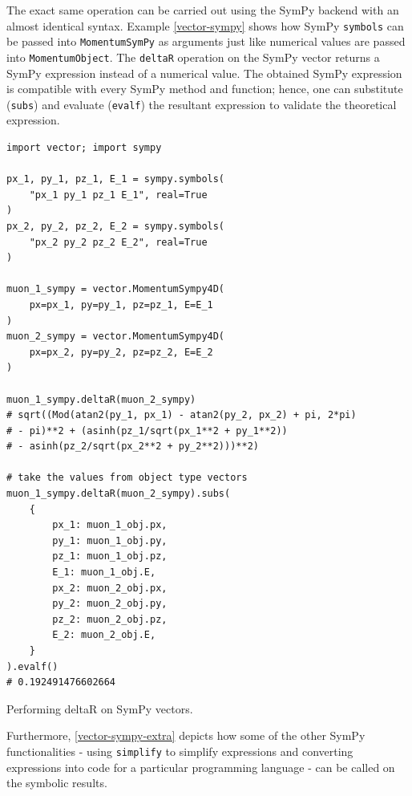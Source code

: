 \documentclass{webofc}
\begin{document}
The exact same operation can be carried out using the SymPy backend with an almost identical syntax. Example \ref{vector-sympy} shows how SymPy \texttt{symbols} can be passed into \texttt{MomentumSymPy} as arguments just like numerical values are passed into \texttt{MomentumObject}. The \texttt{deltaR} operation on the SymPy vector returns a SymPy expression instead of a numerical value. The obtained SymPy expression is compatible with every SymPy method and function; hence, one can substitute (\texttt{subs}) and evaluate (\texttt{evalf}) the resultant expression to validate the theoretical expression.

\begin{listing}[!ht]
\begin{verbatim}
import vector; import sympy

px_1, py_1, pz_1, E_1 = sympy.symbols(
    "px_1 py_1 pz_1 E_1", real=True
)
px_2, py_2, pz_2, E_2 = sympy.symbols(
    "px_2 py_2 pz_2 E_2", real=True
)

muon_1_sympy = vector.MomentumSympy4D(
    px=px_1, py=py_1, pz=pz_1, E=E_1
)
muon_2_sympy = vector.MomentumSympy4D(
    px=px_2, py=py_2, pz=pz_2, E=E_2
)

muon_1_sympy.deltaR(muon_2_sympy)
# sqrt((Mod(atan2(py_1, px_1) - atan2(py_2, px_2) + pi, 2*pi)
# - pi)**2 + (asinh(pz_1/sqrt(px_1**2 + py_1**2))
# - asinh(pz_2/sqrt(px_2**2 + py_2**2)))**2)

# take the values from object type vectors
muon_1_sympy.deltaR(muon_2_sympy).subs(
    {
        px_1: muon_1_obj.px,
        py_1: muon_1_obj.py,
        pz_1: muon_1_obj.pz,
        E_1: muon_1_obj.E,
        px_2: muon_2_obj.px,
        py_2: muon_2_obj.py,
        pz_2: muon_2_obj.pz,
        E_2: muon_2_obj.E,
    }
).evalf()
# 0.192491476602664
\end{verbatim}
\caption{Performing deltaR on SymPy vectors.}
\label{vector-sympy}
\end{listing}

Furthermore, \ref{vector-sympy-extra} depicts how some of the other SymPy functionalities - using \texttt{simplify} to simplify expressions and converting expressions into code for a particular programming language - can be called on the symbolic results.
\end{document}
